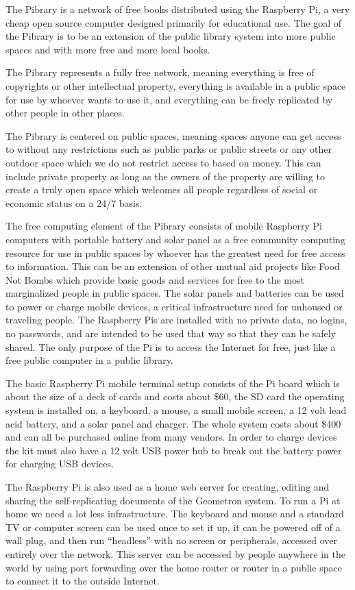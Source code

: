 

The Pibrary is a network of free books distributed using the Raspberry
Pi, a very cheap open source computer designed primarily for educational
use. The goal of the Pibrary is to be an extension of the public library
system into more public spaces and with more free and more local books.

The Pibrary represents a fully free network, meaning everything is free
of copyrights or other intellectual property, everything is available in
a public space for use by whoever wants to use it, and everything can be
freely replicated by other people in other places.

The Pibrary is centered on public spaces, meaning spaces anyone can get
access to without any restrictions such as public parks or public
streets or any other outdoor space which we do not restrict access to
based on money. This can include private property as long as the owners
of the property are willing to create a truly open space which welcomes
all people regardless of social or economic status on a 24/7 basis.

The free computing element of the Pibrary consists of mobile Raspberry
Pi computers with portable battery and solar panel as a free community
computing resource for use in public spaces by whoever has the greatest
need for free access to information. This can be an extension of other
mutual aid projects like Food Not Bombs which provide basic goods and
services for free to the most marginalized people in public spaces. The
solar panels and batteries can be used to power or charge mobile
devices, a critical infrastructure need for unhoused or traveling
people. The Raspberry Pis are installed with no private data, no logins,
no passwords, and are intended to be used that way so that they can be
safely shared. The only purpose of the Pi is to access the Internet for
free, just like a free public computer in a public library.

The basic Raspberry Pi mobile terminal setup consists of the Pi board
which is about the size of a deck of cards and costs about \$60, the SD
card the operating system is installed on, a keyboard, a mouse, a small
mobile screen, a 12 volt lead acid battery, and a solar panel and
charger. The whole system costs about \$400 and can all be purchased
online from many vendors. In order to charge devices the kit must also
have a 12 volt USB power hub to break out the battery power for charging
USB devices.

The Raspberry Pi is also used as a home web server for creating, editing
and sharing the self-replicating documents of the Geometron system. To
run a Pi at home we need a lot less infrastructure. The keyboard and
mouse and a standard TV or computer screen can be used once to set it
up, it can be powered off of a wall plug, and then run ``headless'' with
no screen or peripherals, accessed over entirely over the network. This
server can be accessed by people anywhere in the world by using port
forwarding over the home router or router in a public space to connect
it to the outside Internet.

